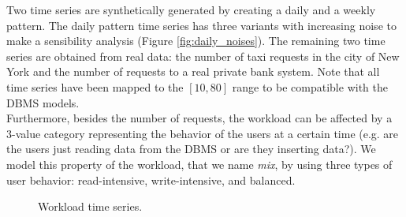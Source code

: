 \documentclass[a4paper, 12pt]{article} %
\begin{document}
	Two time series are synthetically generated by creating a daily and a weekly pattern. The daily pattern time series has three variants with increasing noise to make a sensibility analysis (Figure \ref{fig:daily_noises}). The remaining two time series are obtained from real data: the number of taxi requests in the city of New York \cite{TaxiDataset} and the number of requests to a real private bank system. Note that all time series have been mapped to the $[10, 80]$ range to be compatible with the DBMS models. \\
	Furthermore, besides the number of requests, the workload can be affected by a 3-value category representing the behavior of the users at a certain time (e.g. are the users just reading data from the DBMS or are they inserting data?). We model this property of the workload, that we name \textit{mix}, by using three types of user behavior: read-intensive, write-intensive, and balanced.
	\begin{figure}\centering
		 \hfill
		
		\caption{Workload time series.}
		\label{fig:time_series}
	\end{figure}
	
\end{document}
